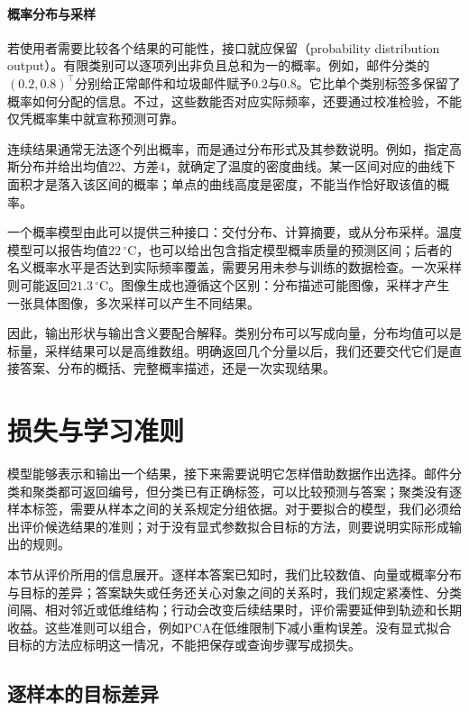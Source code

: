 \paragraph{概率分布与采样}
\label{sec:models-distribution-output}

若使用者需要比较各个结果的可能性，接口就应保留（probability distribution output）。有限类别可以逐项列出非负且总和为一的概率。例如，邮件分类的$(0.2,0.8)^{\top}$分别给正常邮件和垃圾邮件赋予$0.2$与$0.8$。它比单个类别标签多保留了概率如何分配的信息。不过，这些数能否对应实际频率，还要通过校准检验，不能仅凭概率集中就宣称预测可靠。

连续结果通常无法逐个列出概率，而是通过分布形式及其参数说明。例如，指定高斯分布并给出均值$22$、方差$4$，就确定了温度的密度曲线。某一区间对应的曲线下面积才是落入该区间的概率；单点的曲线高度是密度，不能当作恰好取该值的概率。

一个概率模型由此可以提供三种接口：交付分布、计算摘要，或从分布采样。温度模型可以报告均值$22\,^{\circ}\mathrm{C}$，也可以给出包含指定模型概率质量的预测区间；后者的名义概率水平是否达到实际频率覆盖，需要另用未参与训练的数据检查。一次采样则可能返回$21.3\,^{\circ}\mathrm{C}$。图像生成也遵循这个区别：分布描述可能图像，采样才产生一张具体图像，多次采样可以产生不同结果。

因此，输出形状与输出含义要配合解释。类别分布可以写成向量，分布均值可以是标量，采样结果可以是高维数组。明确返回几个分量以后，我们还要交代它们是直接答案、分布的概括、完整概率描述，还是一次实现结果。

\section{损失与学习准则}
\label{sec:models-objectives}

模型能够表示和输出一个结果，接下来需要说明它怎样借助数据作出选择。邮件分类和聚类都可返回编号，但分类已有正确标签，可以比较预测与答案；聚类没有逐样本标签，需要从样本之间的关系规定分组依据。对于要拟合的模型，我们必须给出评价候选结果的准则；对于没有显式参数拟合目标的方法，则要说明实际形成输出的规则。

本节从评价所用的信息展开。逐样本答案已知时，我们比较数值、向量或概率分布与目标的差异；答案缺失或任务还关心对象之间的关系时，我们规定紧凑性、分类间隔、相对邻近或低维结构；行动会改变后续结果时，评价需要延伸到轨迹和长期收益。这些准则可以组合，例如PCA在低维限制下减小重构误差。没有显式拟合目标的方法应标明这一情况，不能把保存或查询步骤写成损失。

\subsection{逐样本的目标差异}
\label{sec:models-pointwise-objectives}

